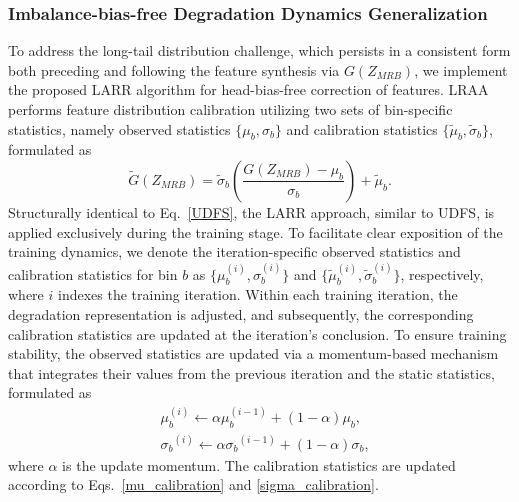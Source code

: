 \documentclass[lettersize,journal]{IEEEtran}
\begin{document}
\subsubsection{Imbalance-bias-free Degradation Dynamics Generalization}

To address the long-tail distribution challenge, which persists in a consistent form both preceding and following the feature synthesis via $G(Z_{MRB})$, we implement the proposed LARR algorithm for head-bias-free correction of features.
LRAA performs feature distribution calibration utilizing two sets of bin-specific statistics, namely observed statistics $\{{\mu}_{\textit{b}}, {\sigma}_{\textit{b}}\}$ and calibration statistics $\{\widetilde{\mu}_{\textit{b}}, \widetilde{\sigma}_{\textit{b}}\}$, formulated as
\begin{equation}
    \widetilde{G}(Z_{MRB})=\widetilde{\sigma}_{\textit{b}}\left(\frac{G(Z_{MRB}) - \mu_{\textit{b}}}{\sigma_{\textit{b}}}\right)+\widetilde{\mu}_{\textit{b}}.
\end{equation}
Structurally identical to Eq.~\eqref{UDFS}, the LARR approach, similar to UDFS, is applied exclusively during the training stage. %
To facilitate clear exposition of the training dynamics, we denote the iteration-specific observed statistics and calibration statistics for bin $\textit{b}$ as $\{\mu_{\textit{b}}^{(i)}, \sigma_{\textit{b}}^{(i)}\}$ and $\{\widetilde{\mu}_{\textit{b}}^{(i)}, {\widetilde{\sigma}_{\textit{b}}^{(i)}}\}$, respectively, where $i$ indexes the training iteration. Within each training iteration, the degradation representation is adjusted, and subsequently, the corresponding calibration statistics are updated at the iteration's conclusion.
To ensure training stability, the observed statistics are updated via a momentum-based mechanism that integrates their values from the previous iteration and the static statistics, formulated as
\begin{align}
    & \mu_{\textit{b}}^{(i)} \leftarrow \alpha\mu_{\textit{b}}^{(i-1)}+(1-\alpha)\mu_{\textit{b}}, \\
    & {\sigma_{\textit{b}}}^{(i)} \leftarrow \alpha{\sigma_{\textit{b}}}^{(i-1)}+(1-\alpha)\sigma_{\textit{b}},
\end{align}
where $\alpha$ is the update momentum. The calibration statistics are updated according to Eqs.~\eqref{mu_calibration} and \eqref{sigma_calibration}.
\end{document}
